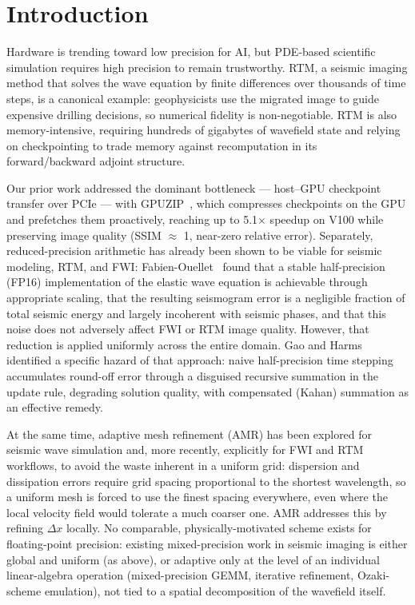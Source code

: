 \documentclass[12pt,a4paper]{article}
\begin{document}
\section{Introduction}

Hardware is trending toward low precision for AI, but PDE-based scientific
simulation requires high precision to remain trustworthy. RTM, a seismic imaging
method that solves the wave equation by finite differences over thousands of
time steps, is a canonical example: geophysicists use the migrated image to
guide expensive drilling decisions, so numerical fidelity is non-negotiable. RTM
is also memory-intensive, requiring hundreds of gigabytes of wavefield state and
relying on checkpointing to trade memory against recomputation in its
forward/backward adjoint structure.

Our prior work addressed the dominant bottleneck --- host--GPU checkpoint
transfer over PCIe --- with GPUZIP~\cite{maltempi2025checkpointing,gpuzip}, which
compresses checkpoints on the GPU and prefetches them proactively, reaching up to
5.1$\times$ speedup on V100 while preserving image quality (SSIM $\approx$ 1,
near-zero relative error). Separately, reduced-precision arithmetic has already
been shown to be viable for seismic modeling, RTM, and FWI:
Fabien-Ouellet~\cite{fabienouellet2020half} found that a stable half-precision
(FP16) implementation of the elastic wave equation is achievable through
appropriate scaling, that the resulting seismogram error is a negligible fraction
of total seismic energy and largely incoherent with seismic phases, and that this
noise does not adversely affect FWI or RTM image quality. However, that reduction
is applied uniformly across the entire domain. Gao and
Harms~\cite{gao2023half} identified a specific hazard of that approach: naive
half-precision time stepping accumulates round-off error through a disguised
recursive summation in the update rule, degrading solution quality, with
compensated (Kahan) summation as an effective remedy.

At the same time, adaptive mesh refinement (AMR) has been explored for seismic
wave simulation and, more recently, explicitly for FWI and RTM workflows, to
avoid the waste inherent in a uniform grid: dispersion and dissipation errors
require grid spacing proportional to the shortest wavelength, so a uniform mesh
is forced to use the finest spacing everywhere, even where the local velocity
field would tolerate a much coarser one. AMR addresses this by refining
$\Delta x$ locally. No comparable, physically-motivated scheme exists for
floating-point precision: existing mixed-precision work in seismic imaging is
either global and uniform (as above), or adaptive only at the level of an
individual linear-algebra operation (mixed-precision GEMM, iterative refinement,
Ozaki-scheme emulation), not tied to a spatial decomposition of the wavefield
itself.
\end{document}
